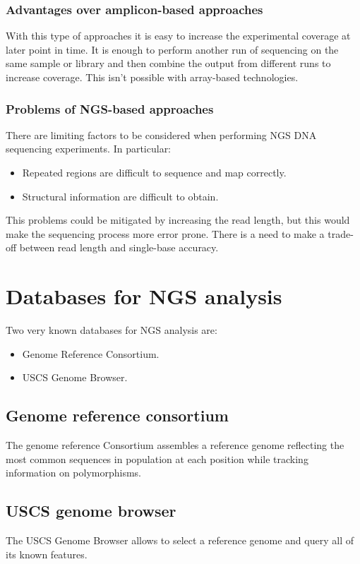         \subsubsection{Advantages over amplicon-based approaches}
        With this type of approaches it is easy to increase the experimental coverage at later point in time.
        It is enough to perform another run of sequencing on the same sample or library and then combine the output from different runs to increase coverage.
        This isn't possible with array-based technologies.

        \subsubsection{Problems of NGS-based approaches}
        There are limiting factors to be considered when performing NGS DNA sequencing experiments.
        In particular:

        \begin{multicols}{2}
            \begin{itemize}
                \item Repeated regions are difficult to sequence and map correctly.
                \item Structural information are difficult to obtain.
            \end{itemize}
        \end{multicols}

        This problems could be mitigated by increasing the read length, but this would make the sequencing process more error prone.
        There is a need to make a trade-off between read length and single-base accuracy.

\section{Databases for NGS analysis}
Two very known databases for NGS analysis are:

\begin{multicols}{2}
    \begin{itemize}
        \item Genome Reference Consortium.
        \item USCS Genome Browser.
    \end{itemize}
\end{multicols}

    \subsection{Genome reference consortium}
    The genome reference Consortium assembles a reference genome reflecting the most common sequences in population at each position while tracking information on polymorphisms.

    \subsection{USCS genome browser}
    The USCS Genome Browser allows to  select a reference genome and query all of its known features.
